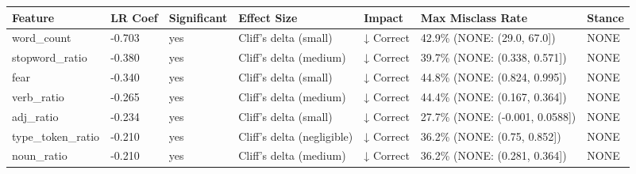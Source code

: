 \begin{tabular}{lllllll}
\toprule
Feature & LR Coef & Significant & Effect Size & Impact & Max Misclass Rate & Stance \\
\midrule
word\_count & -0.703 & yes & Cliff's delta (small) & ↓ Correct & 42.9\% (NONE: (29.0, 67.0]) & NONE \\
stopword\_ratio & -0.380 & yes & Cliff's delta (medium) & ↓ Correct & 39.7\% (NONE: (0.338, 0.571]) & NONE \\
fear & -0.340 & yes & Cliff's delta (small) & ↓ Correct & 44.8\% (NONE: (0.824, 0.995]) & NONE \\
verb\_ratio & -0.265 & yes & Cliff's delta (medium) & ↓ Correct & 44.4\% (NONE: (0.167, 0.364]) & NONE \\
adj\_ratio & -0.234 & yes & Cliff's delta (small) & ↓ Correct & 27.7\% (NONE: (-0.001, 0.0588]) & NONE \\
type\_token\_ratio & -0.210 & yes & Cliff's delta (negligible) & ↓ Correct & 36.2\% (NONE: (0.75, 0.852]) & NONE \\
noun\_ratio & -0.210 & yes & Cliff's delta (medium) & ↓ Correct & 36.2\% (NONE: (0.281, 0.364]) & NONE \\
\bottomrule
\end{tabular}
